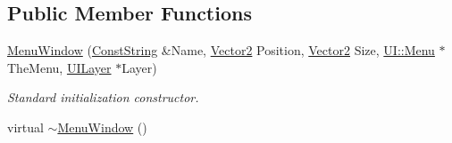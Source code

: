 \subsection*{Public Member Functions}
\begin{DoxyCompactItemize}
\item 
\hyperlink{classphys_1_1UI_1_1MenuWindow_a302446ef6f8b160f1b8be2e3fdfda7b7}{MenuWindow} (\hyperlink{namespacephys_a5ce5049f8b4bf88d6413c47b504ebb31}{ConstString} \&Name, \hyperlink{classphys_1_1Vector2}{Vector2} Position, \hyperlink{classphys_1_1Vector2}{Vector2} Size, \hyperlink{classphys_1_1UI_1_1Menu}{UI::Menu} $\ast$TheMenu, \hyperlink{classphys_1_1UILayer}{UILayer} $\ast$Layer)
\begin{DoxyCompactList}\small\item\em Standard initialization constructor. \item\end{DoxyCompactList}\item 
\hypertarget{classphys_1_1UI_1_1MenuWindow_a8de1eab7a7897e24dfb722cce7d903eb}{
virtual \hyperlink{classphys_1_1UI_1_1MenuWindow_a8de1eab7a7897e24dfb722cce7d903eb}{$\sim$MenuWindow} ()}
\label{d4/d07/classphys_1_1UI_1_1MenuWindow_a8de1eab7a7897e24dfb722cce7d903eb}


\end{DoxyCompactItemize}
